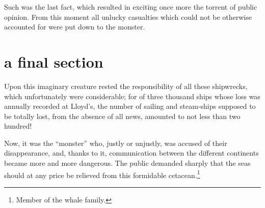 Such was the last fact, which resulted in exciting once more the torrent
of public opinion.  From this moment all unlucky casualties which could
not be otherwise accounted for were put down to the monster.

\section{a final section}

Upon this imaginary creature rested the responsibility of all
these shipwrecks, which unfortunately were considerable;
for of three thousand ships whose loss was annually recorded
at Lloyd's, the number of sailing and steam-ships supposed
to be totally lost, from the absence of all news, amounted to
not less than two hundred!

Now, it was the ``monster'' who, justly or unjustly, was accused
of their disappearance, and, thanks to it, communication between
the different continents became more and more dangerous.
The public demanded sharply that the seas should at any price be
relieved from this formidable cetacean.\footnote{Member of the whale family.}

